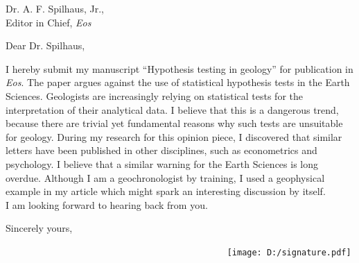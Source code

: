 \documentclass[a4]{letter}
\date{28 April 2009}
\begin{document}
\begin{letter}{Dr. A. F. Spilhaus, Jr., \\
Editor in Chief, {\it Eos}}

\opening{Dear Dr. Spilhaus,} 

I hereby submit my manuscript ``Hypothesis testing in geology'' for
publication in {\it Eos}. The paper argues against the use of
statistical hypothesis tests in the Earth Sciences.  Geologists are
increasingly relying on statistical tests for the interpretation of
their analytical data.  I believe that this is a dangerous trend,
because there are trivial yet fundamental reasons why such tests are
unsuitable for geology. During my research for this opinion piece, I
discovered that similar letters have been published in other
disciplines, such as econometrics and psychology.  I believe that a
similar warning for the Earth Sciences is long overdue. Although I am
a geochronologist by training, I used a geophysical example in my
article which might spark an interesting discussion by itself.
\\

I am looking forward to hearing back from you.

\closing{Sincerely yours,}

~~~~~~~~~~~~~~~~~~~~~~~~~~~~~~~~~~~~~~~~~~~~~   
\texttt{[image: D:/signature.pdf]}

\end{letter}
\end{document}

